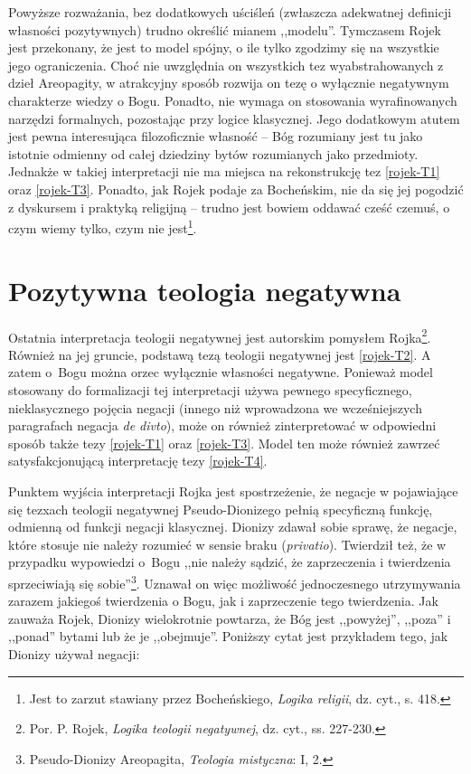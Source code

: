 Powyższe rozważania, bez dodatkowych uściśleń (zwłaszcza adekwatnej definicji własności pozytywnych)
trudno określić mianem ,,modelu''. Tymczasem Rojek jest przekonany, że jest to model spójny, o ile tylko zgodzimy się na
wszystkie jego ograniczenia. Choć nie
uwzględnia on wszystkich tez wyabstrahowanych z dzieł Areopagity, w
atrakcyjny sposób rozwija on tezę o wyłącznie negatywnym charakterze
wiedzy o Bogu. Ponadto, nie wymaga on stosowania wyrafinowanych
narzędzi formalnych, pozostając przy logice klasycznej. Jego dodatkowym
atutem jest pewna interesująca filozoficznie własność -- Bóg rozumiany
jest tu jako istotnie odmienny od całej dziedziny bytów rozumianych
jako przedmioty. Jednakże w takiej interpretacji nie ma miejsca na
rekonstrukcję tez \eqref{rojek-T1} oraz \eqref{rojek-T3}. Ponadto, jak Rojek podaje za Bocheńskim, nie da się jej pogodzić z
dyskursem i praktyką religijną -- trudno jest bowiem oddawać cześć
czemuś, o czym wiemy tylko, czym nie jest\footnote{Jest to zarzut
stawiany przez Bocheńskiego, \textit{Logika religii}, dz. cyt., s. 418.}.



\section{Pozytywna teologia negatywna}\label{roj-pozytywna}

Ostatnia interpretacja teologii negatywnej jest autorskim pomysłem
Rojka\footnote{Por. P. Rojek, \textit{Logika teologii negatywnej}, dz. cyt., ss. 227-230. }. Również na
jej gruncie, podstawą tezą teologii negatywnej jest \eqref{rojek-T2}. A zatem
o~Bogu można orzec wyłącznie własności negatywne. Ponieważ model
stosowany do formalizacji tej interpretacji używa pewnego
specyficznego, nieklasycznego pojęcia negacji (innego niż wprowadzona
we wcześniejszych paragrafach negacja \textit{de divto}), może on
również zinterpretować w odpowiedni sposób także tezy \eqref{rojek-T1} oraz \eqref{rojek-T3}.
Model ten może również zawrzeć satysfakcjonującą interpretację tezy
\eqref{rojek-T4}.

Punktem wyjścia interpretacji Rojka jest spostrzeżenie, że negacje w
pojawiające się tezxach teologii negatywnej Pseudo-Dionizego pełnią
specyficzną funkcję, odmienną od funkcji negacji klasycznej. Dionizy
zdawał sobie sprawę, że negacje, które stosuje nie należy rozumieć w
sensie braku (\textit{privatio}). Twierdził też, że w przypadku
wypowiedzi o~Bogu ,,nie należy sądzić, że zaprzeczenia i twierdzenia
sprzeciwiają się sobie''\footnote{Pseudo-Dionizy Areopagita, \textit{Teologia mistyczna}:
I, 2. }. Uznawał on więc możliwość jednoczesnego utrzymywania
zarazem jakiegoś twierdzenia o Bogu, jak i zaprzeczenie tego twierdzenia. Jak
zauważa Rojek, Dionizy wielokrotnie powtarza, że Bóg jest ,,powyżej'',
,,poza'' i ,,ponad'' bytami lub że je ,,obejmuje''. Poniższy cytat jest
przykładem tego, jak Dionizy używał negacji:



